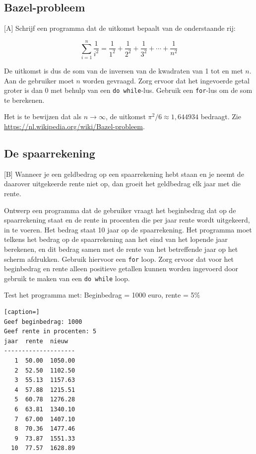 \documentclass[a4paper,10pt,fleqn,twoside]{article}
\begin{document}
\subsection{Bazel-probleem }[A]
Schrijf een programma dat de uitkomst bepaalt van de onderstaande rij:

\begin{equation*}
\sum_{i=1}^n \dfrac{1}{i^2} = \dfrac{1}{1^2} + \dfrac{1}{2^2} + \dfrac{1}{3^2} + \cdots + \dfrac{1}{n^2}
\end{equation*}

De uitkomst is dus de som van de inversen van de kwadraten van 1 tot en met $n$. Aan de gebruiker moet $n$ worden gevraagd. Zorg ervoor dat het ingevoerde getal groter is dan 0 met behulp van een \lstinline|do while|-lus. Gebruik een \lstinline|for|-lus om de som te berekenen.

Het is te bewijzen dat als $n\longrightarrow\infty$, de uitkomst $\pi^2/6 \approx 1,\!644934$ bedraagt. Zie \url{https://nl.wikipedia.org/wiki/Bazel-probleem}.

\subsection{De spaarrekening}[B]
Wanneer je een geldbedrag op een spaarrekening hebt staan en je neemt de daarover uitgekeerde rente niet op, dan groeit het geldbedrag elk jaar met die rente. 

Ontwerp een programma dat de gebruiker vraagt het beginbedrag dat op de spaarrekening staat en de rente in procenten die per jaar rente wordt uitgekeerd, in te voeren. Het bedrag staat 10 jaar op de spaarrekening. Het programma moet telkens het bedrag op de spaarrekening aan het eind van het lopende jaar berekenen, en dit bedrag samen met de rente van het betreffende jaar op het scherm afdrukken. Gebruik hiervoor een \lstinline|for| loop. Zorg ervoor dat voor het beginbedrag en rente alleen positieve getallen kunnen worden ingevoerd door gebruik te maken van een \lstinline|do while| loop.

Test het programma met: Beginbedrag = 1000 euro, rente = 5\%

\begin{lstlisting}[caption=]
Geef beginbedrag: 1000
Geef rente in procenten: 5
jaar  rente  nieuw
--------------------
   1  50.00  1050.00
   2  52.50  1102.50
   3  55.13  1157.63
   4  57.88  1215.51
   5  60.78  1276.28
   6  63.81  1340.10
   7  67.00  1407.10
   8  70.36  1477.46
   9  73.87  1551.33
  10  77.57  1628.89
\end{lstlisting}
\end{document}
